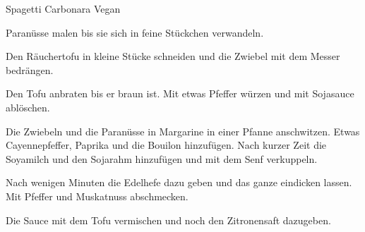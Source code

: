
\begin{recipe}[]{Spagetti Carbonara Vegan}{}{}



\step
Paran\"usse malen bis sie sich in feine St\"uckchen verwandeln.

\step
Den R\"auchertofu in kleine St\"ucke schneiden und die Zwiebel mit dem Messer bedr\"angen.


\step
Den Tofu anbraten bis er braun ist. Mit etwas Pfeffer w\"urzen und mit Sojasauce abl\"oschen.

\step
Die Zwiebeln und die Paran\"usse in Margarine in einer Pfanne anschwitzen. Etwas Cayennepfeffer, Paprika und die Bouilon hinzuf\"ugen. Nach kurzer Zeit die Soyamilch und den Sojarahm hinzuf\"ugen und mit dem Senf verkuppeln.

\step
Nach wenigen Minuten die Edelhefe dazu geben und das ganze eindicken lassen. Mit Pfeffer und Muskatnuss abschmecken.

\step
Die Sauce mit dem Tofu vermischen und noch den Zitronensaft dazugeben.


\end{recipe}
